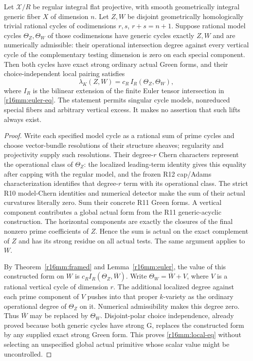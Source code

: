 \begin{theorem}
\label{r16mm:local}
Let $\mathcal X/R$ be regular integral flat projective, with
smooth geometrically integral generic fiber $X$ of dimension
$n$. Let $Z,W$ be disjoint geometrically homologically trivial
rational cycles of codimensions $r,s$, $r+s=n+1$.
Suppose rational model cycles $\Theta_Z,\Theta_W$ of those
codimensions have generic cycles exactly $Z,W$ and are
numerically admissible: their operational intersection degree
against every vertical cycle of the complementary testing
dimension is zero on each special component. Then both cycles
have exact strong ordinary actual Green forms, and their
choice-independent local pairing satisfies
\[
 \lambda_K(Z,W)=c_R\,I_R(\Theta_Z,\Theta_W),
 \tag{MM16.9}\label{r16mm:local-eq}
\]
where $I_R$ is the bilinear extension of the finite Euler tensor
intersection in \eqref{r16mm:euler-eq}. The statement permits
singular cycle models, nonreduced special fibers and arbitrary
vertical excess. It makes no assertion that such lifts always
exist.
\end{theorem}

\begin{proof}
Write each specified model cycle as a rational sum of prime
cycles and choose vector-bundle resolutions of their structure
sheaves; regularity and projectivity supply such resolutions.
Their degree-$r$ Chern characters represent the operational
class of $\Theta_Z$: the localized leading-term identity gives
this equality after capping with the regular model, and the frozen
R12 cap/Adams characterization identifies that degree-$r$ term
with its operational class. The strict R10 model-Chern identities and
numerical detector make the sum of their actual curvatures
literally zero. Sum their concrete R11 Green forms. A vertical
component contributes a global actual form from the R11
generic-acyclic construction. The horizontal components are
exactly the closures of the final nonzero prime coefficients
of $Z$. Hence the sum is actual on the exact complement of
$Z$ and has its strong residue on all actual tests. The same
argument applies to $W$.

By Theorem~\ref{r16mm:framed} and Lemma~\ref{r16mm:euler},
the value of this constructed form on $W$ is
$c_R I_R(\Theta_Z,\overline W)$.
Write $\Theta_W=\overline W+V$, where $V$ is a rational
vertical cycle of dimension $r$. The additional localized
degree against each prime component of $V$ pushes into that
proper $k$-variety as the ordinary operational degree of
$\Theta_Z$ on it. Numerical admissibility makes this degree
zero. Thus $\overline W$ may be replaced by $\Theta_W$.
Disjoint-polar choice independence, already proved because both
generic cycles have strong G, replaces the constructed form
by any supplied exact strong Green form. This proves
\eqref{r16mm:local-eq} without selecting an unspecified global
actual primitive whose scalar value might be uncontrolled.
\end{proof}

